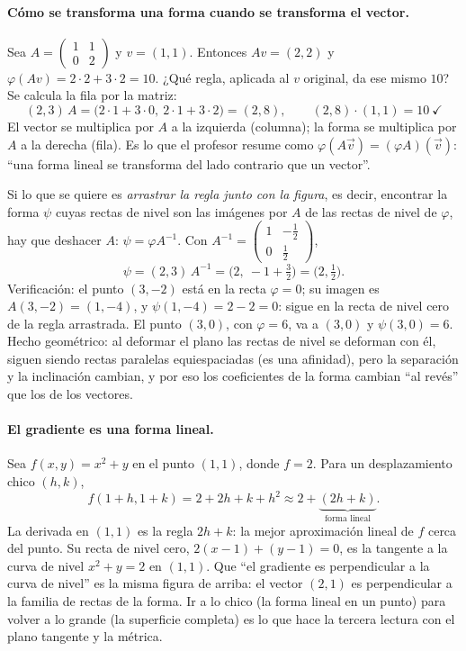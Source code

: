 \paragraph{Cómo se transforma una forma cuando se transforma el vector.} Sea
\(A=\begin{pmatrix}1&1\\0&2\end{pmatrix}\) y \(v=(1,1)\). Entonces \(Av=(2,2)\) y
\(\varphi(Av)=2\cdot2+3\cdot2=10\). ¿Qué regla, aplicada al \(v\) original, da ese mismo
\(10\)? Se calcula la fila por la matriz:
\[
  (2,3)\,A=\bigl(2\cdot1+3\cdot0,\ 2\cdot1+3\cdot2\bigr)=(2,8),
  \qquad (2,8)\cdot(1,1)=10\ \checkmark
\]
El vector se multiplica por \(A\) a la izquierda (columna); la forma se multiplica por
\(A\) a la derecha (fila). Es lo que el profesor resume como \(\varphi(A\vec v)=(\varphi A)(\vec v)\):
``una forma lineal se transforma del lado contrario que un vector''.

Si lo que se quiere es \emph{arrastrar la regla junto con la figura}, es decir, encontrar
la forma \(\psi\) cuyas rectas de nivel son las imágenes por \(A\) de las rectas de nivel
de \(\varphi\), hay que deshacer \(A\): \(\psi=\varphi A^{-1}\). Con
\(A^{-1}=\begin{pmatrix}1&-\tfrac12\\0&\tfrac12\end{pmatrix}\),
\[
  \psi=(2,3)\,A^{-1}=\bigl(2,\ -1+\tfrac32\bigr)=\bigl(2,\tfrac12\bigr).
\]
Verificación: el punto \((3,-2)\) está en la recta \(\varphi=0\); su imagen es
\(A(3,-2)=(1,-4)\), y \(\psi(1,-4)=2-2=0\): sigue en la recta de nivel cero de la regla
arrastrada. El punto \((3,0)\), con \(\varphi=6\), va a \((3,0)\) y \(\psi(3,0)=6\).
Hecho geométrico: al deformar el plano las rectas de nivel se deforman con él, siguen
siendo rectas paralelas equiespaciadas (es una afinidad), pero la separación y la
inclinación cambian, y por eso los coeficientes de la forma cambian ``al revés'' que los
de los vectores.

\paragraph{El gradiente es una forma lineal.} Sea \(f(x,y)=x^2+y\) en el punto \((1,1)\),
donde \(f=2\). Para un desplazamiento chico \((h,k)\),
\[
  f(1+h,1+k)=2+2h+k+h^2\approx 2+\underbrace{(2h+k)}_{\text{forma lineal}} .
\]
La derivada en \((1,1)\) es la regla \(2h+k\): la mejor aproximación lineal de \(f\) cerca
del punto. Su recta de nivel cero, \(2(x-1)+(y-1)=0\), es la tangente a la curva de nivel
\(x^2+y=2\) en \((1,1)\). Que ``el gradiente es perpendicular a la curva de nivel'' es la
misma figura de arriba: el vector \((2,1)\) es perpendicular a la familia de rectas de la
forma. Ir a lo chico (la forma lineal en un punto) para volver a lo grande (la superficie
completa) es lo que hace la tercera lectura con el plano tangente y la métrica.

